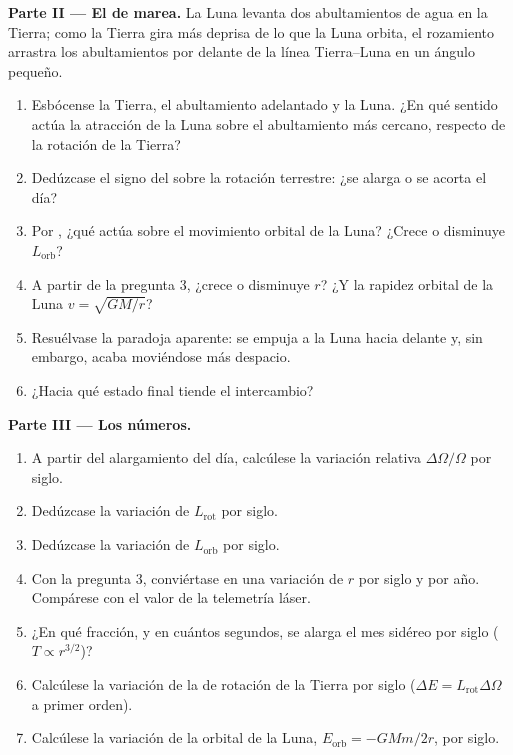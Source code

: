 \begin{problem}
\medskip
\noindent\textbf{Parte II --- El  de marea.}
La Luna levanta dos abultamientos de agua en la Tierra; como la Tierra
gira más deprisa de lo que la Luna orbita, el rozamiento arrastra los
abultamientos por delante de la línea Tierra--Luna en un ángulo pequeño.
\begin{enumerate}[resume]
  \item Esbócense la Tierra, el abultamiento adelantado y la Luna. ¿En qué
        sentido actúa la atracción de la Luna sobre el abultamiento más
        cercano, respecto de la rotación de la Tierra?
  \item Dedúzcase el signo del  sobre la rotación terrestre: ¿se
        alarga o se acorta el día?
  \item Por , ¿qué  actúa sobre el movimiento
        orbital de la Luna? ¿Crece o disminuye $L_{\text{orb}}$?
  \item A partir de la pregunta 3, ¿crece o disminuye $r$? ¿Y la rapidez
        orbital de la Luna $v = \sqrt{GM/r}$?
  \item Resuélvase la paradoja aparente: se empuja a la Luna hacia
        delante y, sin embargo, acaba moviéndose más despacio.
  \item ¿Hacia qué estado final tiende el intercambio?
\end{enumerate}

\medskip
\noindent\textbf{Parte III --- Los números.}
\begin{enumerate}[resume]
  \item A partir del alargamiento del día, calcúlese la variación relativa
        $\Delta\Omega/\Omega$ por siglo.
  \item Dedúzcase la variación de $L_{\text{rot}}$ por siglo.
  \item Dedúzcase la variación de $L_{\text{orb}}$ por siglo.
  \item Con la pregunta 3, conviértase en una variación de $r$ por siglo
        y por año. Compárese con el valor de la telemetría láser.
  \item ¿En qué fracción, y en cuántos segundos, se alarga el mes sidéreo
        por siglo ($T \propto r^{3/2}$)?
  \item Calcúlese la variación de la  de rotación de la
        Tierra por siglo ($\Delta E = L_{\text{rot}}\Delta\Omega$ a primer
        orden).
  \item Calcúlese la variación de la  orbital de la Luna,
        $E_{\text{orb}} = -GMm/2r$, por siglo.
\end{enumerate}


\end{problem}
